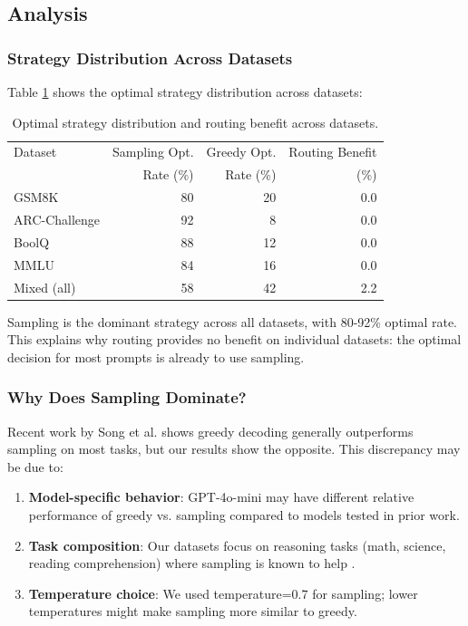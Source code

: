 \documentclass[11pt,letterpaper]{article}
\begin{document}
\subsection{Analysis}

\subsubsection{Strategy Distribution Across Datasets}

Table \ref{tab:strategy_dist} shows the optimal strategy distribution across datasets:

\begin{table}[!htbp]
    \centering
    \caption{Optimal strategy distribution and routing benefit across datasets.}
    \label{tab:strategy_dist}
    \begin{tabular}{lrrr}
        \toprule
        Dataset & Sampling Opt. & Greedy Opt. & Routing Benefit \\
        & Rate (\%) & Rate (\%) & (\%) \\
        \midrule
        GSM8K & 80 & 20 & 0.0 \\
        ARC-Challenge & 92 & 8 & 0.0 \\
        BoolQ & 88 & 12 & 0.0 \\
        MMLU & 84 & 16 & 0.0 \\
        Mixed (all) & 58 & 42 & 2.2 \\
        \bottomrule
    \end{tabular}
\end{table}

Sampling is the dominant strategy across all datasets, with 80-92\% optimal rate. This explains why routing provides no benefit on individual datasets: the optimal decision for most prompts is already to use sampling.

\subsubsection{Why Does Sampling Dominate?}

Recent work by Song et al. \cite{Song2024} shows greedy decoding generally outperforms sampling on most tasks, but our results show the opposite. This discrepancy may be due to:

\begin{enumerate}
    \item \textbf{Model-specific behavior}: GPT-4o-mini may have different relative performance of greedy vs. sampling compared to models tested in prior work.
    \item \textbf{Task composition}: Our datasets focus on reasoning tasks (math, science, reading comprehension) where sampling is known to help \cite{Wang2022}.
    \item \textbf{Temperature choice}: We used temperature=0.7 for sampling; lower temperatures might make sampling more similar to greedy.
\end{enumerate}
\end{document}
